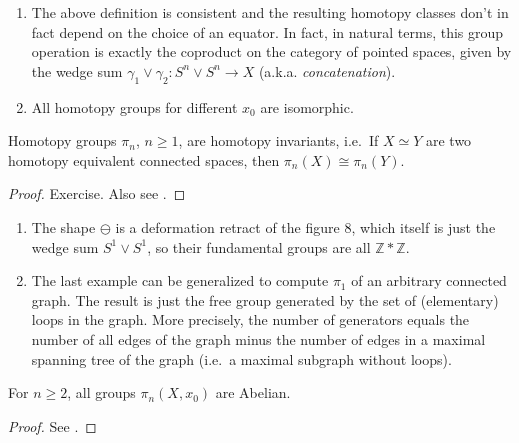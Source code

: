 \documentclass[english,letterpaper]{article}%
\numberwithin{equation}{section}
\numberwithin{figure}{section}
\numberwithin{table}{section}
\theoremstyle{definition}
\theoremstyle{definition}
\theoremstyle{definition}
\theoremstyle{plain}
\theoremstyle{plain}
\theoremstyle{plain}
\theoremstyle{plain}
\theoremstyle{remark}
\theoremstyle{remark}
\def\red{\color{red}}
\renewcommand{\geq}{\geqslant}
\newcommand{\PRLsep}{   %
           \noindent\makebox[\linewidth]{
                \resizebox{0.5\linewidth}{1pt}{$\blacklozenge$}}}
\begin{document}
\begin{xca}
\begin{enumerate}
    \item The above definition is consistent and the resulting homotopy classes don't in fact depend on the choice of an equator. In fact, in natural terms, this group operation is exactly the coproduct on the category of pointed spaces, given by the wedge sum $\gamma_1\lor\gamma_2:S^n\lor S^n\to X$ (a.k.a. \emph{concatenation}).
    \item All homotopy groups for different $x_0$ are isomorphic.
\end{enumerate}

\end{xca}
\begin{thm}
Homotopy groups $\pi_n$, $n\geq 1$, are homotopy invariants, i.e.\ If $X\simeq Y$ are two homotopy equivalent connected spaces, then $\pi_n(X)\cong\pi_n(Y)$.
\end{thm}
\begin{proof}
Exercise. Also see \cite{Hatcher}.
\end{proof}

\begin{example}
\begin{enumerate}
    \item The shape $\ominus$ is a deformation retract of the figure 8, which itself is just the wedge sum $S^1\vee S^1$, so their fundamental groups are all $\mathbb{Z}\ast\mathbb{Z}$.
    \item The last example can be generalized to compute $\pi_1$ of an arbitrary connected graph. The result is just the free group generated by the set of (elementary) loops in the graph. More precisely, the number of generators equals the number of all edges of the graph minus the number of edges in a maximal spanning tree of the graph (i.e.\ a maximal subgraph without loops).
\end{enumerate}
\end{example}

\begin{thm}
For $n\geq 2$, all groups $\pi_n(X,x_0)$ are Abelian.
\end{thm}
\begin{proof}
See \cite{Hatcher}.
\end{proof}

\end{document}
